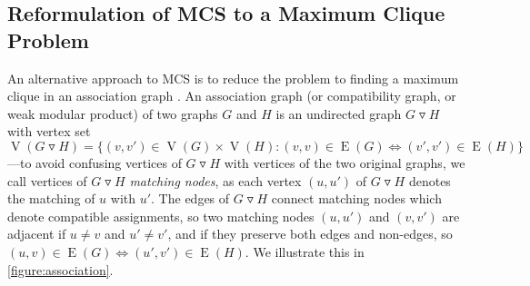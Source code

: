 \documentclass{llncs}
\newcommand{\modularproduct}{\operatorname{\triangledown}}
\begin{document}
\subsection{Reformulation of MCS to a Maximum Clique Problem}\label{clique}

An alternative approach to MCS is to reduce the problem to finding a maximum clique in an
association graph \cite{LeviG,bala86,dura99,DBLP:journals/jcamd/RaymondW02a}.
An association graph (or compatibility graph, or weak modular product) of two graphs $G$ and $H$ is
an undirected graph $G \modularproduct H$ with vertex set $\operatorname{V}(G \modularproduct H) =
\{ (v, v') \in \operatorname{V}(G) \times \operatorname{V}(H) : (v, v) \in \operatorname{E}(G)
\Leftrightarrow (v', v') \in \operatorname{E}(H)\}$---to avoid confusing vertices of $G \modularproduct
H$ with vertices of the two original graphs, we call vertices of $G \modularproduct H$
\emph{matching nodes}, as each vertex $(u, u')$ of $G \modularproduct H$ denotes the matching of $u$
with $u'$. The edges of $G \modularproduct H$ connect matching nodes which denote compatible
assignments, so two matching nodes $(u, u')$ and  $(v, v')$ are adjacent if $u \neq v$ and $u' \neq
v'$, and if they preserve both edges and non-edges, so $(u, v) \in \operatorname{E}(G)
\Leftrightarrow (u', v') \in \operatorname{E}(H)$. We illustrate this in \cref{figure:association}.
\end{document}
